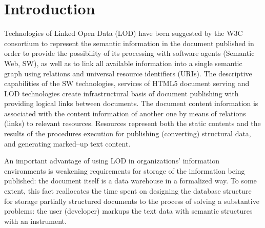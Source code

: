 \documentclass[conference,a4paper]{IEEEtran}
\begin{document}
\section{Introduction}






Technologies of Linked Open Data (LOD) \cite{b1} have been suggested by
the W3C consortium to represent the semantic information in the document
published in order to provide the possibility of its processing with
software agents (Semantic Web, SW), as well as to link all available
information into a single semantic graph using relations and universal
resource identifiers (URIs).  The descriptive capabilities of the
SW technologies, services of HTML5 document serving and
LOD technologies create infrastructural basis of document publishing
with providing logical links between documents.  The document content
information is associated with the content information of another one by
means of relations (links) to relevant resources.  Resources represent
both the static contents and the results of the procedures execution for
publishing (converting) structural data, and generating marked--up text
content.

An important advantage of using LOD in organizations' information
environments is weakening requirements for storage of the information
being published: the document itself is a data warehouse in a formalized
way.  To some extent, this fact reallocates the time spent on designing
the database structure for storage partially structured documents to the
process of solving a substantive problems: the user (developer) markups
the text data with semantic structures with an instrument.
\end{document}
